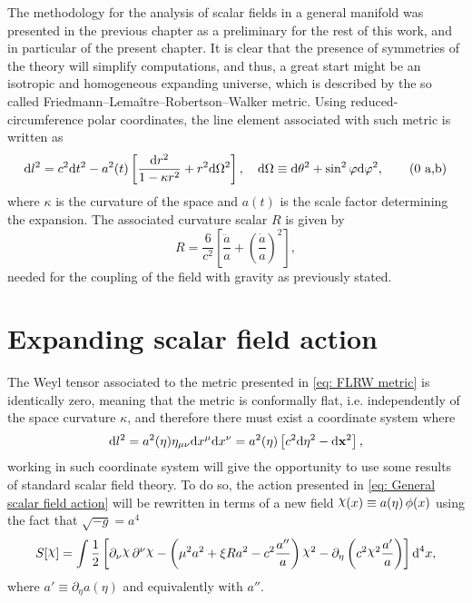 The methodology for the analysis of scalar fields in a general manifold was presented in the previous chapter as a  preliminary for the rest of this work, and in particular of the present chapter. It is clear that the presence of symmetries of the theory will simplify computations, and thus, a great start might be an isotropic and homogeneous expanding universe, which is described by the so called Friedmann–Lemaître–Robertson–Walker metric. Using  reduced-circumference polar coordinates, the line element associated with such metric is written as
\begin{subequations}\label{eq: FLRW metric}
	\begin{gather}
		\text{d} l^2 =c^2\text{d} t^2 -a^2(t)\left[\frac{\text{d} r^2}{1-\kappa r^2}+r^2\text{d}\Omega^2\right],\quad \text{d}\Omega\equiv \text{d}\theta^2+\sin^2\varphi\text{d}\varphi^2,\tag{\theequation \,\,a,b}
	\end{gather}
\end{subequations}
where $\kappa$ is the curvature of the space and $a(t)$ is the scale factor determining the expansion. The associated curvature scalar $R$ is given by
\begin{equation}\label{eq: FLRW Curvature}
	R=\frac{6}{c^2}\left[\frac{\ddot{a}}{a}+\left(\frac{\dot{a}}{a}\right)^2\right],
\end{equation}
needed for the coupling of the field with gravity as previously stated.
\section{Expanding scalar field action}
The Weyl tensor associated to the metric presented in \cref{eq: FLRW metric} is identically zero, meaning that the metric is conformally flat, i.e. independently of the space curvature $\kappa$, and therefore there must exist a coordinate system where
\begin{equation}\label{eq: Conformal FLRW}
	\text{d} l^2=a^2(\eta)\eta_{\mu\nu}\text{d} x^\mu\text{d} x^\nu=a^2(\eta)\left[c^2\text{d} \eta^2-\text{d}\mathbf{x}^2\right],
\end{equation}
working in such coordinate system will give the opportunity to use some results of standard scalar field theory. To do so, the action presented in \cref{eq: General scalar field action} will be rewritten in terms of a new field $\rchi(x)\equiv a(\eta)\,\phi(x)$ using the fact that $\sqrt{-g}=a^4$ 
\begin{equation}
	S[\rchi]=\int\frac{1}{2}\left[\partial_\nu\rchi\,\partial^\nu\rchi-\left(\mu^2a^2+\xi R a^2-c^2\frac{a''}{a}\right)\rchi^2-\partial_\eta\left(c^2\rchi^2\frac{a'}{a}\right)\right]\td^4 x,
\end{equation}
where $a'\equiv \partial_\eta a(\eta)$ and equivalently with $a''$.

